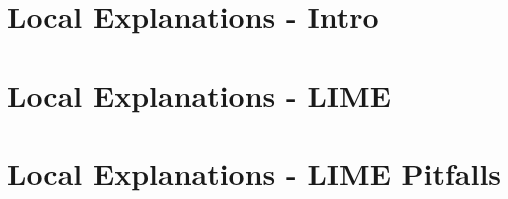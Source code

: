 \documentclass[11pt,compress,t,notes=noshow, aspectratio=169, xcolor=table]{beamer}
\begin{document}


\section{Local Explanations - Intro}


\section{Local Explanations - LIME}



\section{Local Explanations - LIME Pitfalls}

\end{document}
